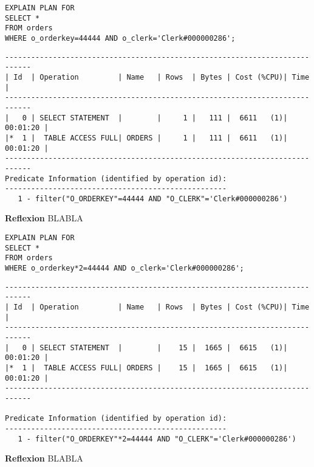 \documentclass[10pt]{article}
\begin{document}
\begin{lstlisting}[style=sql]
EXPLAIN PLAN FOR
SELECT *
FROM orders
WHERE o_orderkey=44444 AND o_clerk='Clerk#000000286';
\end{lstlisting}
\begin{lstlisting}[style=queryexecutionplan]
----------------------------------------------------------------------------
| Id  | Operation         | Name   | Rows  | Bytes | Cost (%CPU)| Time     |
----------------------------------------------------------------------------
|   0 | SELECT STATEMENT  |        |     1 |   111 |  6611   (1)| 00:01:20 |
|*  1 |  TABLE ACCESS FULL| ORDERS |     1 |   111 |  6611   (1)| 00:01:20 |
----------------------------------------------------------------------------
Predicate Information (identified by operation id):
---------------------------------------------------
   1 - filter("O_ORDERKEY"=44444 AND "O_CLERK"='Clerk#000000286')
\end{lstlisting}
\textbf{Reflexion} \newline
BLABLA

\begin{lstlisting}[style=sql]
EXPLAIN PLAN FOR 
SELECT *
FROM orders
WHERE o_orderkey*2=44444 AND o_clerk='Clerk#000000286';
\end{lstlisting}
\begin{lstlisting}[style=queryexecutionplan]
----------------------------------------------------------------------------
| Id  | Operation         | Name   | Rows  | Bytes | Cost (%CPU)| Time     |
----------------------------------------------------------------------------
|   0 | SELECT STATEMENT  |        |    15 |  1665 |  6615   (1)| 00:01:20 |
|*  1 |  TABLE ACCESS FULL| ORDERS |    15 |  1665 |  6615   (1)| 00:01:20 |
----------------------------------------------------------------------------
 
Predicate Information (identified by operation id):
---------------------------------------------------
   1 - filter("O_ORDERKEY"*2=44444 AND "O_CLERK"='Clerk#000000286')
\end{lstlisting}
\textbf{Reflexion} \newline
BLABLA
\end{document}
